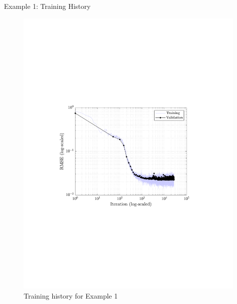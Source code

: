 \documentclass[9pt]{beamer}
\newcounter{frame}[frame]
\begin{document}
\begin{frame}{Example 1: Training History}
\begin{figure}
	\includegraphics[height=.8\textheight]{neuralNetHysteresis01RMSE}
	\caption{Training history for Example 1}
\end{figure}
\end{frame}
\end{document}
